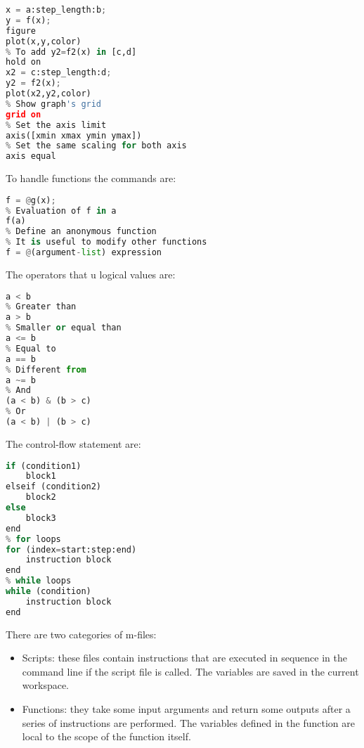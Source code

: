 \documentclass[12pt, a4paper]{report}
\newtheorem[style=M,bodystyle=\normalfont]{theorem}{Theorem}
\newtheorem[style=M,bodystyle=\normalfont]{corollary}{Corollary}
\newtheorem[style=M,bodystyle=\normalfont]{lemma}{Lemma}
\newtheorem[style=M,bodystyle=\normalfont]{definition}{Definition}
\begin{document}
    \begin{lstlisting}[language=Python]
% To plot y=f(x) in [a,b]
x = a:step_length:b;
y = f(x);   
figure         
plot(x,y,color)
% To add y2=f2(x) in [c,d]
hold on 
x2 = c:step_length:d;
y2 = f2(x);
plot(x2,y2,color)     
% Show graph's grid
grid on 
% Set the axis limit
axis([xmin xmax ymin ymax]) 
% Set the same scaling for both axis
axis equal 
    \end{lstlisting} 
    To handle functions the commands are: 
    \begin{lstlisting}[language=Python]
% Define a function handle to g(x)
f = @g(x);
% Evaluation of f in a
f(a) 
% Define an anonymous function
% It is useful to modify other functions
f = @(argument-list) expression
    \end{lstlisting} 
    The operators that u logical values are:  
    \begin{lstlisting}[language=Python]
% Smaller than
a < b     
% Greater than
a > b
% Smaller or equal than
a <= b   
% Equal to
a == b    
% Different from
a ~= b  
% And
(a < b) & (b > c)  
% Or   
(a < b) | (b > c)     
    \end{lstlisting} 
    The control-flow statement are: 
    \begin{lstlisting}[language=Python]
% if-then-else statements
if (condition1)
    block1
elseif (condition2)
    block2
else
    block3
end
% for loops
for (index=start:step:end)
    instruction block
end
% while loops
while (condition)
    instruction block
end
    \end{lstlisting}    
    There are two categories of m-files: 
    \begin{itemize}
        \item Scripts: these files contain instructions that are executed in sequence in the command line if the script file is called. 
            The variables are saved in the current workspace.
        \item Functions: they take some input arguments and return some outputs after a series of instructions are performed. 
            The variables defined in the function are local to the scope of the function itself.
    \end{itemize}

\newpage
\end{document}
